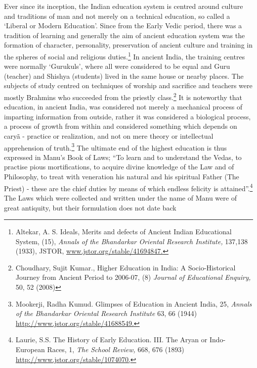 \begin{multicols}{2}
\vspace{-.1cm}


\vspace{-.1cm}

\noi
Ever since its inception, the Indian education system is centred around culture and traditions
of man and not merely on a technical education, so called a ‘Liberal or Modern Education’.
Since from the Early Vedic period, there was a tradition of learning and generally the aim of 
ancient education system was the formation of character, personality, preservation of ancient
culture and training in the spheres of social and religious duties.\footnote{Altekar, A. S. Ideals, Merits and defects of Ancient Indian Educational System, (15), \textit{Annals of the Bhandarkar Oriental Research Institute,} 137,138 (1933), JSTOR, \url{www.jstor.org/stable/41694847.}} In ancient India, the training
centres were normally ‘Gurukuls’, where all were considered to be equal and Guru (teacher)
and Shishya (students) lived in the same house or nearby places. The subjects of study
centred on techniques of worship and sacrifice and teachers were mostly Brahmins who
succeeded from the priestly class.\footnote{Choudhary, Sujit Kumar., Higher Education in India: A Socio-Historical Journey from Ancient Period to 2006-07, (8) \textit{Journal of Educational Enquiry,} 50, 52 (2008)} It is noteworthy that education, in ancient India, was considered not merely a mechanical process of imparting information from outside, rather it was considered a biological process, a process of growth from within and considered
something which depends on caryã - practice or realization, and not on mere theory or
intellectual apprehension of truth.\footnote{Mookerji, Radha Kumud. Glimpses of Education in Ancient India, 25, \textit{Annals of the Bhandarkar Oriental Research Institute} 63, 66 (1944) \url{http://www.jstor.org/stable/41688549.}} The ultimate end of the highest education is thus
expressed in Manu's Book of Laws; “To learn and to understand the Vedas, to practise pious
mortifications, to acquire divine knowledge of the Law and of Philosophy, to treat with
veneration his natural and his spiritual Father (The Priest) - these are the chief duties by
means of which endless felicity is attained”.\footnote{Laurie, S.S. The History of Early Education. III. The Aryan or Indo-European Races, 1, \textit{The School Review,} 668, 676 (1893) \url{http://www.jstor.org/stable/1074070,}} The Laws which were collected and written under the name of Manu were of great antiquity, but their formulation does not date back

\end{multicols}

